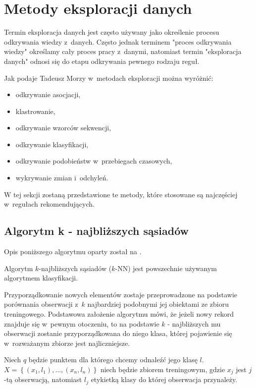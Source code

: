 \documentclass[12pt,a4paper]{report}
\newcommand{\set}[1]{\left\lbrace {#1} \right\rbrace}
\begin{document}
\section{Metody eksploracji danych}

Termin eksploracja danych jest często używany jako określenie procesu odkrywania wiedzy z~danych. Często jednak terminem  "proces odkrywania wiedzy" określamy cały proces pracy z~danymi, natomiast termin "eksploracja danych" odnosi się do etapu odkrywania pewnego rodzaju reguł.

Jak podaje Tadeusz Morzy \citep{edmia} w~metodach eksploracji można wyróżnić:
\begin{itemize}
\item odkrywanie asocjacji,
\item klastrowanie,
\item odkrywanie wzorców sekwencji,
\item odkrywanie klasyfikacji,
\item odkrywanie podobieństw w~przebiegach czasowych,
\item wykrywanie zmian i~odchyleń.
\end{itemize}

W tej sekcji zostaną przedstawione te metody, które stosowane są najczęściej w~regułach rekomendujących.


\subsection{Algorytm k - najbliższych sąsiadów }
Opis poniższego algorytmu oparty został na {\citep[Sec 2.3.1]{rsh}}.

Algorytm $k$-najbliższych sąsiadów ($k$-NN) jest powszechnie używanym algorytmem klasyfikacji.
 
Przyporządkowanie nowych elementów zostaje przeprowadzone na podstawie porównania obserwacji z~$k$ najbardziej podobnymi jej obiektami ze zbioru treningowego. Podstawowa założenie algorytmu mówi, że jeżeli nowy rekord znajduje się w~pewnym otoczeniu, to na podstawie $k$ - najbliższych mu obserwacji zostanie przyporządkowana do niego klasa, której pojawienie się w~rozważanym zbiorze jest najliczniejsze.

Niech $q$ będzie punktem dla którego chcemy odnaleźć jego klasę $l$. 
\\$\mathit{X}=\set{(x_1,l_1),\ldots,(x_n,l_n)}$ niech będzie zbiorem treningowym, gdzie $x_j$ jest $j$-tą obserwacją, natomiast $l_j$ etykietką klasy do której obserwacja przynależy.
\end{document}
